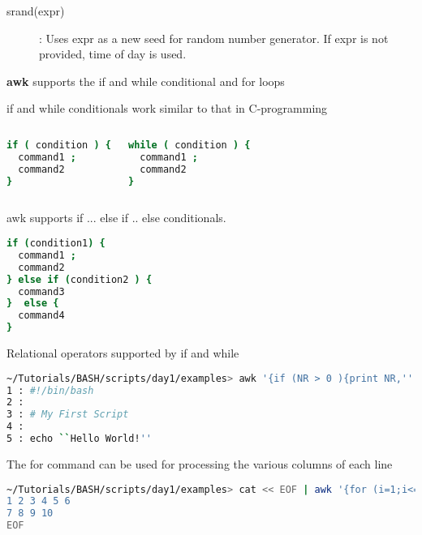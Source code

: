\documentclass[slidestop,mathserif,compress,xcolor=svgnames]{beamer}
\newenvironment{eblock}[0]
{
\begin{beamerboxesrounded}[upper=uppercol2,lower=lowercol2,shadow=true]}
{\end{beamerboxesrounded}}
\begin{document}
\begin{frame}
\begin{itemize}
{\begin{description}
      \item[srand(expr)]: Uses expr as a new seed for random number generator. If expr is not provided, time of day is used.
    \end{description}
    \item \textbf{awk} supports the if and while conditional and for loops
    \item if and while conditionals work similar to that in C-programming
    \begin{columns}
      \begin{eblock}{}
        \begin{lstlisting}[language=bash]
if ( condition ) {
  command1 ;
  command2
}
        \end{lstlisting}
      \end{eblock}
      \begin{eblock}{}
        \begin{lstlisting}[language=bash]
while ( condition ) {
  command1 ;
  command2
}
        \end{lstlisting}
      \end{eblock}
    \end{columns}
    \item awk supports if ... else if .. else conditionals. 
    \begin{lstlisting}[language=bash]
if (condition1) {
  command1 ;
  command2
} else if (condition2 ) {
  command3
}  else {
  command4
}
    \end{lstlisting}
    \item Relational operators supported by if and while
    \begin{description}
      \fontsize{6}{8}\selectfont{
        \item[==]: Is equal to
        \item[!=]: Is not equal to
        \item[>]: Is greater than
        \item[>=]: Is greater than or equal to
        \item[<]: Is less than
        \item[<=]: Is less than or equal to
        \item[$\sim$]: String Matches to
        \item[!$\sim$]: Doesn't Match
      }
    \end{description}
    \begin{lstlisting}[language=bash]
~/Tutorials/BASH/scripts/day1/examples> awk '{if (NR > 0 ){print NR,'':'', $0}}' hello.sh 
1 : #!/bin/bash
2 : 
3 : # My First Script
4 : 
5 : echo ``Hello World!''
    \end{lstlisting}
    \item The for command can be used for processing the various columns of each line
    \begin{lstlisting}[language=bash]
~/Tutorials/BASH/scripts/day1/examples> cat << EOF | awk '{for (i=1;i<=NF;i++){if (i==1){a=$i}else if (i==NF){print a}else{a+=$i}}}'
1 2 3 4 5 6
7 8 9 10
EOF


\end{lstlisting}}
\end{itemize}
\end{frame}
\end{document}
